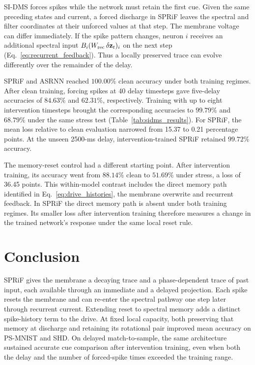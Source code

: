 \documentclass[letterpaper,journal]{IEEEtran}
\begin{document}
SI-DMS forces spikes while the network must retain the first cue. Given the same preceding states and current, a forced discharge in SPRiF leaves the spectral and filter coordinates at their unforced values at that step. The membrane voltage can differ immediately. If the spike pattern changes, neuron $i$ receives an additional spectral input $B_i(W_{\rm rec}\,\delta\mathbf z_t)_i$ on the next step (Eq.~\eqref{eq:recurrent_feedback}). Thus a locally preserved trace can evolve differently over the remainder of the delay.

SPRiF and ASRNN reached $100.00\%$ clean accuracy under both training regimes. After clean training, forcing spikes at 40 delay timesteps gave five-delay accuracies of $84.63\%$ and $62.31\%$, respectively. Training with up to eight intervention timesteps brought the corresponding accuracies to $99.79\%$ and $68.79\%$ under the same stress test (Table~\ref{tab:sidms_results}). For SPRiF, the mean loss relative to clean evaluation narrowed from 15.37 to 0.21 percentage points. At the unseen 2500-ms delay, intervention-trained SPRiF retained $99.72\%$ accuracy.

The memory-reset control had a different starting point. After intervention training, its accuracy went from $88.14\%$ clean to $51.69\%$ under stress, a loss of 36.45 points. This within-model contrast includes the direct memory path identified in Eq.~\eqref{eq:drive_histories}, the membrane overwrite and recurrent feedback. In SPRiF the direct memory path is absent under both training regimes. Its smaller loss after intervention training therefore measures a change in the trained network's response under the same local reset rule.

\section{Conclusion}
\label{sec:conclusion}

SPRiF gives the membrane a decaying trace and a phase-dependent trace of past input, each available through an immediate and a delayed projection. Each spike resets the membrane and can re-enter the spectral pathway one step later through recurrent current. Extending reset to spectral memory adds a distinct spike-history term to the drive. At fixed local capacity, both preserving that memory at discharge and retaining its rotational pair improved mean accuracy on PS-MNIST and SHD. On delayed match-to-sample, the same architecture sustained accurate cue comparison after intervention training, even when both the delay and the number of forced-spike times exceeded the training range.
\end{document}
